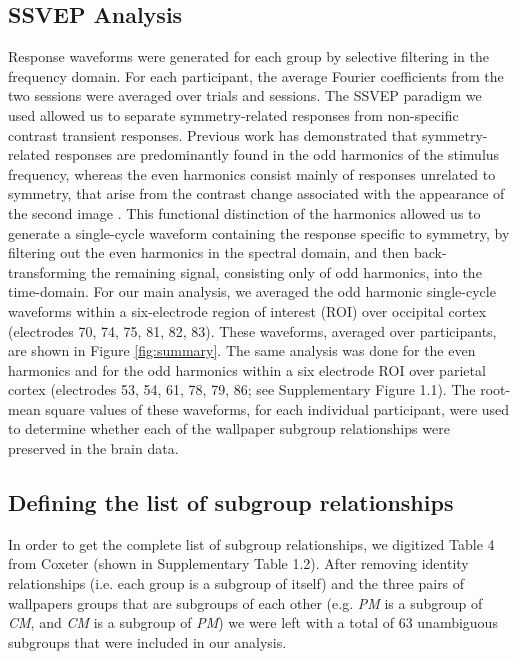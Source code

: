 \documentclass[11pt, twoside]{article}
\begin{document}
\subsection*{SSVEP Analysis}
Response waveforms were generated for each group by selective filtering in the frequency domain. For each participant, the average Fourier coefficients from the two sessions were averaged over trials and sessions. The SSVEP paradigm we used allowed us to separate symmetry-related responses from non-specific contrast transient responses. Previous work has demonstrated that symmetry-related responses are predominantly found in the odd harmonics of the stimulus frequency, whereas the even harmonics consist mainly of responses unrelated to symmetry, that arise from the contrast change associated with the appearance of the second image \citep{RN1954, RN1725}. This functional distinction of the harmonics allowed us to generate a single-cycle waveform containing the response specific to symmetry, by filtering out the even harmonics in the spectral domain, and then back-transforming the remaining signal, consisting only of odd harmonics, into the time-domain. For our main analysis, we averaged the odd harmonic single-cycle waveforms within a six-electrode region of interest (ROI) over occipital cortex (electrodes 70, 74, 75, 81, 82, 83). These waveforms, averaged over participants, are shown in Figure \ref{fig:summary}. The same analysis was done for the even harmonics and for the odd harmonics within a six electrode ROI over parietal cortex (electrodes 53, 54, 61, 78, 79, 86; see Supplementary Figure 1.1). The root-mean square values of these waveforms, for each individual participant, were used to determine whether each of the wallpaper subgroup relationships were preserved in the brain data.  

\subsection*{Defining the list of subgroup relationships}
In order to get the complete list of subgroup relationships, we digitized Table 4 from Coxeter \citep{RN1711} (shown in Supplementary Table 1.2). After removing identity relationships (i.e. each group is a subgroup of itself) and the three pairs of wallpapers groups that are subgroups of each other (e.g. \textit{PM} is a subgroup of \textit{CM}, and \textit{CM} is a subgroup of \textit{PM}) we were left with a total of 63 unambiguous subgroups that were included in our analysis. 
\end{document}
